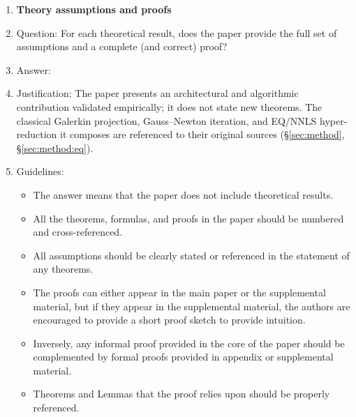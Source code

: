 \begin{enumerate}
\begin{itemize}
        \item The authors should discuss the computational efficiency of the proposed algorithms and how they scale with dataset size.
        \item If applicable, the authors should discuss possible limitations of their approach to address problems of privacy and fairness.
        \item While the authors might fear that complete honesty about limitations might be used by reviewers as grounds for rejection, a worse outcome might be that reviewers discover limitations that aren't acknowledged in the paper. The authors should use their best judgment and recognize that individual actions in favor of transparency play an important role in developing norms that preserve the integrity of the community. Reviewers will be specifically instructed to not penalize honesty concerning limitations.
    \end{itemize}

\item {\bf Theory assumptions and proofs}
    \item[] Question: For each theoretical result, does the paper provide the full set of assumptions and a complete (and correct) proof?
    \item[] Answer: \answerNA{}
    \item[] Justification: The paper presents an architectural and algorithmic contribution validated empirically; it does not state new theorems. The classical Galerkin projection, Gauss--Newton iteration, and EQ/NNLS hyper-reduction it composes are referenced to their original sources (\S\ref{sec:method}, \S\ref{sec:method:eq}).
    \item[] Guidelines:
    \begin{itemize}
        \item The answer \answerNA{} means that the paper does not include theoretical results. 
        \item All the theorems, formulas, and proofs in the paper should be numbered and cross-referenced.
        \item All assumptions should be clearly stated or referenced in the statement of any theorems.
        \item The proofs can either appear in the main paper or the supplemental material, but if they appear in the supplemental material, the authors are encouraged to provide a short proof sketch to provide intuition. 
        \item Inversely, any informal proof provided in the core of the paper should be complemented by formal proofs provided in appendix or supplemental material.
        \item Theorems and Lemmas that the proof relies upon should be properly referenced. 
    \end{itemize}


\end{enumerate}
